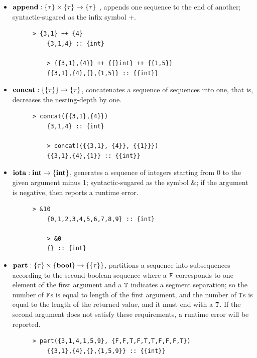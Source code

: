 \begin{itemize}

	\item $\mathbf{append : \{\tau\} \times \{\tau\} \rightarrow \{\tau\}}$ , 
	appends one sequence to the end of another; syntactic-sugared as the infix symbol {\++}.

	\begin{figure}[H]
	\begin{example}
	\end{example}
	\begin{lstlisting}[style = nesl-style]
	> {3,1} ++ {4}
	{3,1,4} :: {int}
	
	> {{3,1},{4}} ++ {{}int} ++ {{1,5}}
	{{3,1},{4},{},{1,5}} :: {{int}}
	\end{lstlisting}
	\end{figure}


	\item $\mathbf{concat: \{\{\tau\}\} \rightarrow \{\tau\} }$, concatenates a sequence of sequences into one, that is, decreases the nesting-depth by one.
	\begin{figure}[H]
	\begin{example}
	\end{example}
	\begin{lstlisting}[style = nesl-style]
	> concat({{3,1},{4}})
	{3,1,4} :: {int}
	
	> concat({{{3,1}, {4}}, {{1}}})
	{{3,1},{4},{1}} :: {{int}}
	\end{lstlisting}
	\end{figure}

	\item $\mathbf{iota: \mathbf{int} \rightarrow \{\mathbf{int}\}}$, generates a sequence of integers starting from 0 to the given argument minus 1; syntactic-sugared as the symbol \&; if the argument is negative, then reports a runtime error.
	\begin{figure}[H]
	\begin{example}
	\end{example}
	\begin{lstlisting}[style = nesl-style]
	> &10
	{0,1,2,3,4,5,6,7,8,9} :: {int}
	
	> &0
	{} :: {int}
	\end{lstlisting}
	\end{figure}
	
	\item $\mathbf{part: \{\tau\} \times \{\mathbf{bool}\} \rightarrow  \{\{\tau\}\}}$, partitions a sequence into subsequences according to the second boolean sequence where a $\mathtt{F}$ corresponds to one element of the first argument and a $\mathtt{T}$ indicates a segment separation; so the number of $\mathtt{F}$s is equal to length of the first argument, and the number of $\mathtt{T}$s is equal to the length of the returned value, and it must end with a $\mathtt{T}$. 
	If the second argument does not satisfy these requirements, a runtime error will be reported.
	\begin{figure}[H]
	\begin{example}
	\end{example}
	\begin{lstlisting}[style = nesl-style]
	> part({3,1,4,1,5,9}, {F,F,T,F,T,T,F,F,F,T})
	{{3,1},{4},{},{1,5,9}} :: {{int}}
	

\end{lstlisting}
\end{figure}
\end{itemize}
